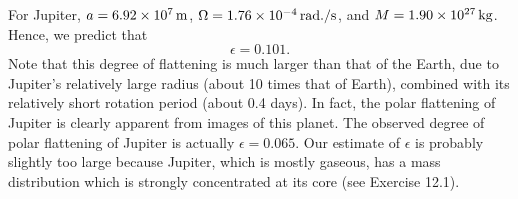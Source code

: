 For Jupiter, $a=6.92\times 10^7\,{\rm m}$, $\Omega = 1.76\times 10^{-4}\,{\rm rad./s}$, and $M=1.90\times 10^{27}\,{\rm kg}$. Hence,
we predict that
\begin{equation}
\epsilon= 0.101.
\end{equation}
Note that this degree of flattening is much larger than that of the Earth, due to
Jupiter's relatively large radius (about 10 times that of Earth), combined with its relatively
short rotation period (about 0.4 days). In fact, the polar flattening of
Jupiter is clearly apparent from images of this planet. The observed degree of
polar flattening of Jupiter is actually $\epsilon=0.065$. Our estimate of $\epsilon$ is probably
slightly too large because Jupiter, which is mostly gaseous, has a mass distribution which is strongly concentrated
at its core (see Exercise 12.1).

